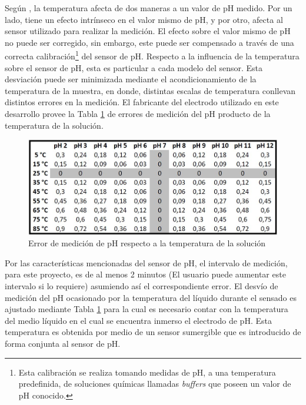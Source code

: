             Según \cite{ElArabe}, la temperatura afecta de dos maneras a un valor de pH medido. Por un lado, tiene un efecto intrínseco en el valor mismo de pH, y por otro, afecta al sensor utilizado para realizar la medición. El efecto sobre el valor mismo de pH no puede ser corregido, sin embargo, este puede ser compensado a través de una correcta calibración\footnote{ Esta calibración se realiza tomando medidas de pH, a una temperatura predefinida, de soluciones químicas llamadas \textit{buffers} que poseen un valor de pH conocido.} del sensor de pH. Respecto a la influencia de la temperatura sobre el sensor de pH, esta es particular a cada modelo del sensor. Esta desviación puede ser minimizada mediante el acondicionamiento de la temperatura de la muestra, en donde, distintas escalas de temperatura conllevan distintos errores en la medición. El fabricante del electrodo utilizado en este desarrollo provee la Tabla \ref{tablePhvsTemp} de errores de medición del pH producto de la temperatura de la solución.
            
            \begin{figure}[h] 
                \centering
                \includegraphics[scale=0.6]{hardware/ErrorMedicionPH.jpg}
                \caption{Error de medición de pH respecto a la temperatura de la solución}
                \label{tablePhvsTemp}
            \end{figure}
            
            \par Por las características mencionadas del sensor de pH, el intervalo de medición, para este proyecto, es de al menos 2 minutos (El usuario puede aumentar este intervalo si lo requiere) asumiendo así el correspondiente error. El desvío de medición del pH ocasionado por la temperatura del líquido durante el sensado es ajustado mediante Tabla \ref{tablePhvsTemp} para la cual es necesario contar con la temperatura del medio líquido en el cual se encuentra inmerso el electrodo de pH. Esta temperatura es obtenida por medio de un sensor sumergible que es introducido de forma conjunta al sensor de pH.
        
